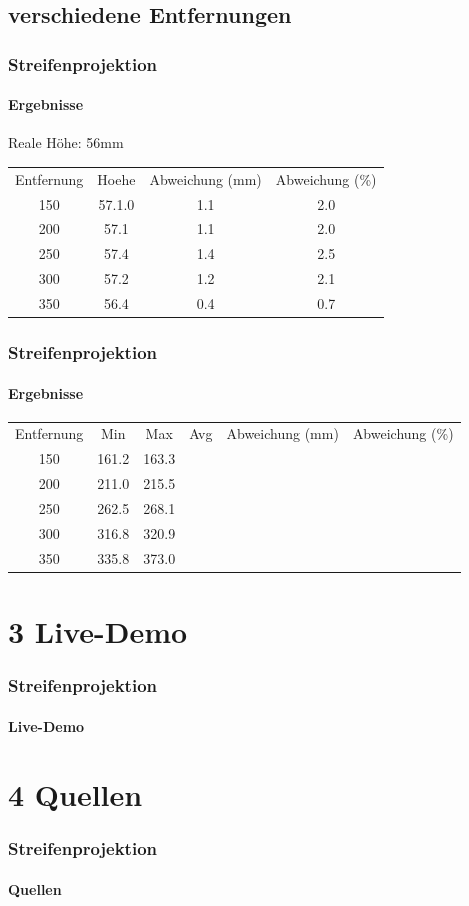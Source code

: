 \documentclass{beamer}
\begin{document}
\subsection{verschiedene Entfernungen}
\begin{frame}
	\frametitle{Streifenprojektion}
	\framesubtitle{Ergebnisse}

	Reale Höhe: 56mm
	\begin{tabular}{c|c|c|c}
		Entfernung & Hoehe & Abweichung (mm) & Abweichung (\%) \\
		150 & 57.1.0 & 1.1 & 2.0\\
		200 & 57.1 & 1.1 & 2.0\\
		250 & 57.4 & 1.4 & 2.5\\
		300 & 57.2 & 1.2 & 2.1\\
		350 & 56.4 & 0.4 & 0.7
	\end{tabular}

\end{frame}

\begin{frame}
	\frametitle{Streifenprojektion}
	\framesubtitle{Ergebnisse}

	\begin{tabular}{c|c|c|c|c|c}
		Entfernung & Min & Max & Avg & Abweichung (mm) & Abweichung (\%)\\
		150 & 161.2 & 163.3\\
		200 & 211.0 & 215.5\\
		250 & 262.5 & 268.1\\
		300 & 316.8 & 320.9\\
		350 & 335.8 & 373.0
	\end{tabular}

\end{frame}


\section{3 \hspace{5px} Live-Demo} 
\begin{frame}
	\frametitle{Streifenprojektion}
	\framesubtitle{Live-Demo}

\end{frame}


\section{4 \hspace{5px} Quellen} 
\begin{frame}
	\frametitle{Streifenprojektion}
	\framesubtitle{Quellen}
	
\end{frame}
\end{document}
